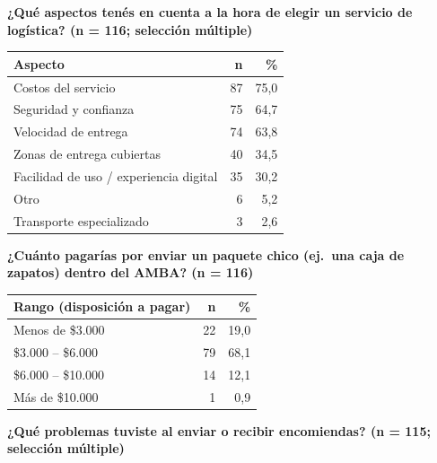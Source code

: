 \bigskip
\noindent\textbf{¿Qué aspectos tenés en cuenta a la hora de elegir un servicio de logística? (n = 116; selección múltiple)}

\begin{center}
\begin{tabular}{lrr}
	\toprule
	\textbf{Aspecto} & \textbf{n} & \textbf{\%} \\
	\midrule
	Costos del servicio                     & 87 & 75,0 \\
	Seguridad y confianza                   & 75 & 64,7 \\
	Velocidad de entrega                    & 74 & 63,8 \\
	Zonas de entrega cubiertas              & 40 & 34,5 \\
	Facilidad de uso / experiencia digital  & 35 & 30,2 \\
	Otro                                    &  6 &  5,2 \\
	Transporte especializado                &  3 &  2,6 \\
	\bottomrule
\end{tabular}
\end{center}

\bigskip
\noindent\textbf{¿Cuánto pagarías por enviar un paquete chico (ej.\ una caja de zapatos) dentro del AMBA? (n = 116)}

\begin{center}
\begin{tabular}{lrr}
	\toprule
	\textbf{Rango (disposición a pagar)} & \textbf{n} & \textbf{\%} \\
	\midrule
	Menos de \$3.000        & 22 & 19,0 \\
	\$3.000 -- \$6.000      & 79 & 68,1 \\
	\$6.000 -- \$10.000     & 14 & 12,1 \\
	Más de \$10.000         &  1 &  0,9 \\
	\bottomrule
\end{tabular}
\end{center}

\bigskip
\noindent\textbf{¿Qué problemas tuviste al enviar o recibir encomiendas? (n = 115; selección múltiple)}

